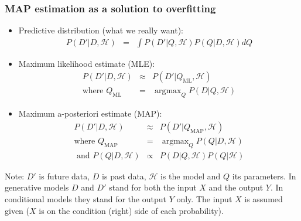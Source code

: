 \documentclass[ignorenonframetext,plain]{beamer}
\DeclareMathOperator*{\argmax}{argmax}
\begin{document}
\begin{frame}\frametitle{MAP estimation as a solution to overfitting}
\begin{itemize}
\item Predictive distribution (what we really want):\begin{eqnarray*}
  P(D'|D,\mathcal{H}) &=& \int P(D'|Q,\mathcal{H}) P(Q|D,\mathcal{H}) dQ 
\end{eqnarray*}
\item Maximum likelihood estimate (MLE):\begin{eqnarray*}
  P(D'|D,\mathcal{H}) &\approx& P(D'|Q_\text{ML}, \mathcal{H}) \\
\mbox{where } Q_\text{ML} &=& \argmax_Q P(D|Q,\mathcal{H})
\end{eqnarray*}
\item Maximum a-posteriori estimate (MAP):\begin{eqnarray*}
  P(D'|D,\mathcal{H}) &\approx& P(D'|Q_\text{MAP}, \mathcal{H}) \\
\mbox{where } Q_\text{MAP} &=& \argmax_Q P(Q|D,\mathcal{H}) \\
\mbox{ and } P(Q|D,\mathcal{H}) &\propto& P(D|Q,\mathcal{H}) P(Q|\mathcal{H})
\end{eqnarray*}
\end{itemize}
\footnotesize Note: $D'$ is future data, $D$ is past data,
$\mathcal{H}$ is the model and $Q$ its parameters.  In generative
models $D$ and $D'$ stand for both the input $X$ and the output $Y$.
In conditional models they stand for the output $Y$ only.  The input
$X$ is assumed given ($X$ is on the condition (right) side of each
probability).
\end{frame}
\end{document}
